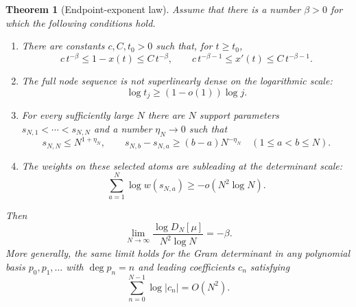 \documentclass[11pt]{amsart}
\numberwithin{equation}{section}
\theoremstyle{plain}
\newtheorem{theorem}{Theorem}[section]
\theoremstyle{definition}
\theoremstyle{remark}
\begin{document}
\begin{theorem}[Endpoint-exponent law]
\label{thm:endpoint_exponent_law}
Assume that there is a number $\beta>0$ for which the following conditions hold.
\begin{enumerate}[label=(\roman*)]
\item There are constants $c,C,t_0>0$ such that, for $t\ge t_0$,
\begin{equation}
c\,t^{-\beta}\le1-x(t)\le C\,t^{-\beta},
\qquad
c\,t^{-\beta-1}\le x'(t)\le C\,t^{-\beta-1}.
\label{eq:endpoint_power_law}
\end{equation}
\item The full node sequence is not superlinearly dense on the logarithmic scale:
\begin{equation}
\log t_j\ge (1-o(1))\log j.
\label{eq:abstract_node_lower_scale}
\end{equation}
\item For every sufficiently large $N$ there are $N$ support parameters
$s_{N,1}<\cdots<s_{N,N}$ and a number $\eta_N\to0$ such that
\begin{equation}
s_{N,N}\le N^{1+\eta_N},
\qquad
s_{N,b}-s_{N,a}\ge(b-a)N^{-\eta_N}
\quad(1\le a<b\le N).
\label{eq:abstract_separated_configuration}
\end{equation}
\item The weights on these selected atoms are subleading at the determinant scale:
\begin{equation}
\sum_{a=1}^N \log w(s_{N,a})
\ge-o(N^2\log N).
\label{eq:abstract_weight_condition}
\end{equation}
\end{enumerate}
Then
\begin{equation}
\boxed{
\lim_{N\to\infty}
\frac{\log D_N[\mu]}{N^2\log N}
=-\beta.}
\label{eq:endpoint_exponent_limit}
\end{equation}
More generally, the same limit holds for the Gram determinant in any polynomial basis $p_0,p_1,\ldots$ with $\deg p_n=n$ and leading coefficients $c_n$ satisfying
\begin{equation}
\sum_{n=0}^{N-1}\log|c_n|=O(N^2).
\label{eq:basis_subleading_condition}
\end{equation}
\end{theorem}
\end{document}
